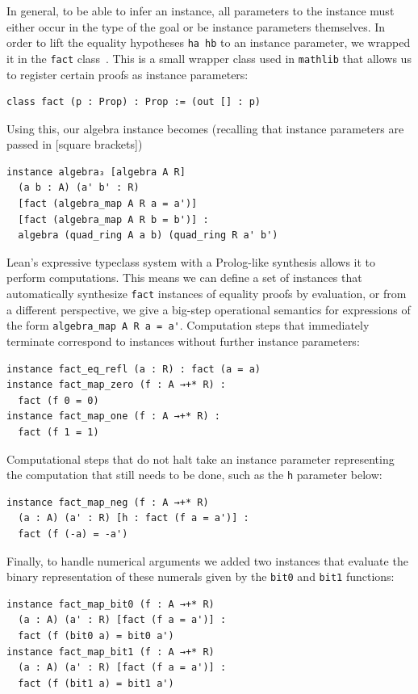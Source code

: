 \documentclass[sigplan,10pt,nonacm,
screen]{acmart} \settopmatter{printfolios=true,printccs=false,printacmref=false}
\newcommand{\mathlib}{\lstinline{mathlib}\xspace}
\begin{document}
    In general, to be able to infer an instance,
    all parameters to the instance must either occur in the type of the goal
    or be instance parameters themselves.
    In order to lift the equality hypotheses \lstinline{ha hb} to an instance parameter, we wrapped it in the \lstinline{fact} class~\cite{typeclasses}.
    This is a small wrapper class used in \mathlib that allows us to register certain proofs as instance parameters:
\begin{lstlisting}
class fact (p : Prop) : Prop := (out [] : p)
\end{lstlisting}
Using this, our algebra instance becomes (recalling that instance parameters are passed in [square brackets])
\begin{lstlisting}
instance algebra₃ [algebra A R]
  (a b : A) (a' b' : R)
  [fact (algebra_map A R a = a')]
  [fact (algebra_map A R b = b')] :
  algebra (quad_ring A a b) (quad_ring R a' b')
\end{lstlisting}
    Lean's expressive typeclass system with a Prolog-like synthesis allows it to perform computations.
    This means we can define a set of instances that automatically synthesize \lstinline{fact} instances of equality proofs by evaluation,
    or from a different perspective, we give a big-step operational semantics for expressions of the form \lstinline{algebra_map A R a = a'}.
    Computation steps that immediately terminate correspond to instances without further instance parameters:
\begin{lstlisting}
instance fact_eq_refl (a : R) : fact (a = a)
instance fact_map_zero (f : A →+* R) :
  fact (f 0 = 0)
instance fact_map_one (f : A →+* R) :
  fact (f 1 = 1)
\end{lstlisting}
	Computational steps that do not halt take an instance parameter representing the computation that still needs to be done, such as the \lstinline{h} parameter below:
\begin{lstlisting}
instance fact_map_neg (f : A →+* R)
  (a : A) (a' : R) [h : fact (f a = a')] :
  fact (f (-a) = -a')
\end{lstlisting}
    Finally, to handle numerical arguments we added two instances that evaluate the binary representation of these numerals
    given by the \lstinline{bit0} and \lstinline{bit1} functions:
\begin{lstlisting}
instance fact_map_bit0 (f : A →+* R)
  (a : A) (a' : R) [fact (f a = a')] :
  fact (f (bit0 a) = bit0 a')
instance fact_map_bit1 (f : A →+* R)
  (a : A) (a' : R) [fact (f a = a')] :
  fact (f (bit1 a) = bit1 a')
\end{lstlisting}
\end{document}

